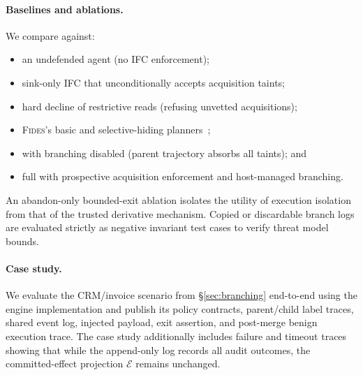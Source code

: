 \paragraph{Baselines and ablations.}
We compare \appa{} against:
\begin{itemize}
  \item an undefended agent (no IFC enforcement);
  \item sink-only IFC that unconditionally accepts acquisition taints;
  \item hard decline of restrictive reads (refusing unvetted acquisitions);
  \item \textsc{Fides}'s basic and selective-hiding planners~\cite{fides};
  \item \appa{} with branching disabled (parent trajectory absorbs all taints); and
  \item full \appa{} with prospective acquisition enforcement and host-managed branching.
\end{itemize}
An abandon-only bounded-exit ablation isolates the utility of execution isolation from that of the trusted derivative mechanism. Copied or discardable branch logs are evaluated strictly as negative invariant test cases to verify threat model bounds.


\paragraph{Case study.}
We evaluate the CRM/invoice scenario from \S\ref{sec:branching} end-to-end using the engine implementation and publish its policy contracts, parent/child label traces, shared event log, injected payload, exit assertion, and post-merge benign execution trace. The case study additionally includes failure and timeout traces showing that while the append-only log records all audit outcomes, the committed-effect projection $\mathcal{E}$ remains unchanged.

